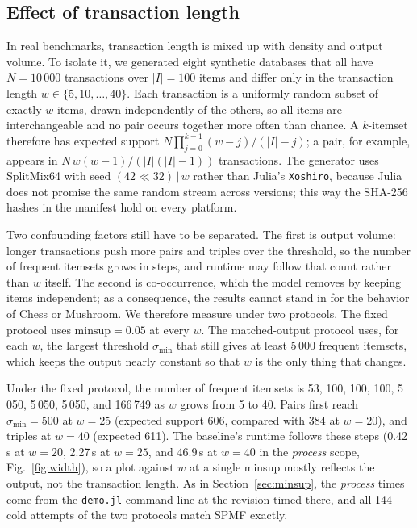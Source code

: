 \subsection{Effect of transaction length}
\label{sec:width}
In real benchmarks, transaction length is mixed up with density and output volume. To
isolate it, we generated eight synthetic databases that all have $N = 10\,000$
transactions over $|I| = 100$ items and differ only in the transaction length
$w \in \{5, 10, \dots, 40\}$. Each transaction is a uniformly random subset of exactly $w$
items, drawn independently of the others, so all items are interchangeable and no pair
occurs together more often than chance. A $k$-itemset therefore has expected support
$N \prod_{j=0}^{k-1} (w - j)/(|I| - j)$; a pair, for example, appears in
$N\,w(w-1)/(|I|(|I|-1))$ transactions. The generator uses SplitMix64 with seed
$(42 \ll 32) \,|\, w$ rather than Julia's \texttt{Xoshiro}, because Julia does not promise
the same random stream across versions; this way the SHA-256 hashes in the manifest hold on
every platform.

Two confounding factors still have to be separated. The first is output volume: longer
transactions push more pairs and triples over the threshold, so the number of frequent
itemsets grows in steps, and runtime may follow that count rather than $w$ itself. The
second is co-occurrence, which the model removes by keeping items independent; as a
consequence, the results cannot stand in for the behavior of Chess or Mushroom. We
therefore measure under two protocols. The fixed protocol uses $\mathrm{minsup} = 0.05$ at
every $w$. The matched-output protocol uses, for each $w$, the largest threshold
$\sigma_{\min}$ that still gives at least 5\,000 frequent itemsets, which keeps the output
nearly constant so that $w$ is the only thing that changes.

Under the fixed protocol, the number of frequent itemsets is 53, 100, 100, 100, 5\,050,
5\,050, 5\,050, and 166\,749 as $w$ grows from 5 to 40. Pairs first reach
$\sigma_{\min} = 500$ at $w = 25$ (expected support 606, compared with 384 at $w = 20$),
and triples at $w = 40$ (expected 611). The baseline's runtime follows these steps
(0.42\,s at $w = 20$, 2.27\,s at $w = 25$, and 46.9\,s at $w = 40$ in the \emph{process}
scope, Fig.~\ref{fig:width}), so a plot against $w$ at a single minsup mostly reflects the
output, not the transaction length. As in Section~\ref{sec:minsup}, the \emph{process}
times come from the \texttt{demo.jl} command line at the revision timed there, and all 144
cold attempts of the two protocols match SPMF exactly.

